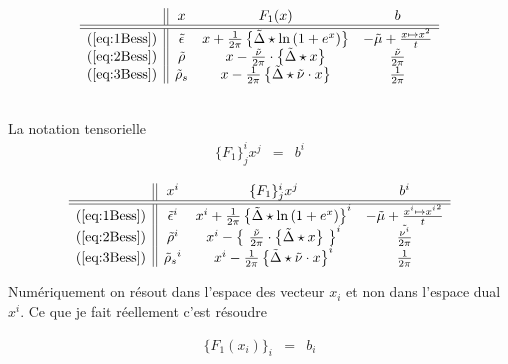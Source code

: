 $$
\begin{array}{c||ccc}
	& x & F_1( x )  & b \\
	\hline\hline
	(\ref{eq:1Bess}) & \tilde{\epsilon} & x + \frac{1}{2 \pi} \left \{\tilde{\Delta} \star \ln \left ( 1 + e^{x} \right )  \right \} & - \tilde{\mu} + \frac{x \mapsto x^2 }{t}	\\
	(\ref{eq:2Bess}) & \tilde{\rho}  & x -\frac{\tilde{\nu}}{2 \pi} \cdot  \left \{\tilde{\Delta} \star x \right \} & \frac{\tilde{\nu}}{2 \pi} \\
	(\ref{eq:3Bess}) & \tilde{\rho}_s  & x - \frac{1}{2 \pi} \left \{\tilde{\Delta} \star \tilde{\nu} \cdot x \right \} & \frac{1}{2 \pi} 
\end{array}
$$

		{~}\\

		La notation tensorielle 		
		\begin{eqnarray}
			\{F_1\}^i_j  x^j   & = & b^i  	
		\end{eqnarray} 
		

		
$$
\begin{array}{c||ccc}
	& x^i & \{F_1\}^i_j  x^j & b^i\\
	\hline\hline
	(\ref{eq:1Bess}) & \tilde{\epsilon}^i & x^i + \frac{1}{2 \pi} \left \{\tilde{\Delta} \star \ln \left ( 1 + e^{x } \right )  \right \}^i  & - \tilde{\mu} + \frac{x^i  \mapsto {x^i }^2 }{t}	\\
	(\ref{eq:2Bess}) & \tilde{\rho}^i  & x^i - \left  \{ \frac{\tilde{\nu}}{2 \pi} \cdot \left \{\tilde{\Delta} \star x \right  \} \right \}^i & \frac{\tilde{\nu^i}}{2 \pi} \\
	(\ref{eq:3Bess}) & {\tilde{\rho}_s}^i  & x^i - \frac{1}{2 \pi} \left \{\tilde{\Delta} \star \tilde{\nu} \cdot  x \right \}^i & \frac{1}{2 \pi} 
\end{array}
$$
		

			
		
		Numériquement on résout dans l'espace des vecteur $x_i$ et non dans l'espace dual $x^i$. Ce que je fait réellement c'est résoudre 
		
		\begin{eqnarray}
			\{F_1(x_i) \}_i    & = & b_i   	
		\end{eqnarray}
		

